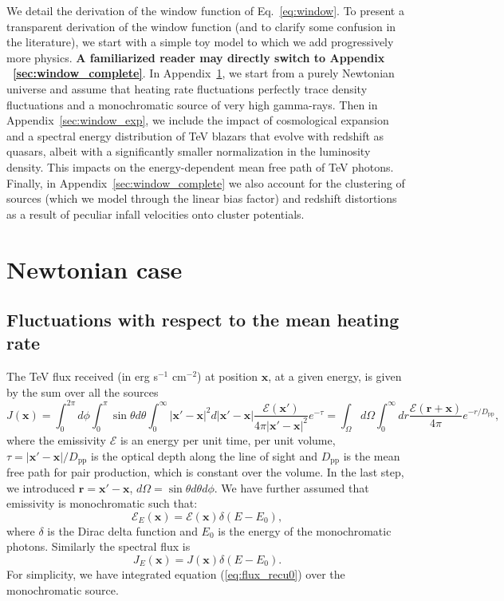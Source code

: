 \documentclass[numberedappendix]{emulateapj}
\newcommand\ALc[1]{{\color{red} \bf #1}} %
\begin{document}
\appendix
We detail the derivation of the window function of Eq.~\eqref{eq:window}. To present a transparent derivation of the window function (and to clarify some confusion in the literature), we start with a simple toy model to which we add progressively more physics. \ALc{A familiarized reader may directly switch to Appendix ~\ref{sec:window_complete}}. In Appendix~\ref{sec:windon_newt}, we start from a purely Newtonian universe and assume that heating rate fluctuations perfectly trace density fluctuations and a monochromatic source of very high gamma-rays. Then in Appendix~\ref{sec:window_exp}, we include the impact of cosmological expansion and a spectral energy distribution of TeV blazars that evolve with redshift as quasars, albeit with a significantly smaller normalization in the luminosity density. This impacts on the energy-dependent mean free path of TeV photons. Finally, in Appendix~\ref{sec:window_complete} we also account for the clustering of sources (which we model through the linear bias factor) and redshift distortions as a result of peculiar infall velocities onto cluster potentials. \\

\section {Newtonian case}\label{sec:windon_newt}
\subsection {Fluctuations with respect to the mean heating rate}

The TeV flux received (in erg s$^{-1}$ cm$^{-2}$) at position $\mathbf{x}$, at a given energy, is given by the sum over all the sources 
\begin{equation}
  \label{eq:flux_recu0}
  J(\mathbf{x})=
  \int_{0}^{2\pi}d\phi\int_{0}^{\pi}\sin\theta d\theta\int_0^{\infty}|\mathbf{x}'-\mathbf{x}|^2 d|\mathbf{x}'-\mathbf{x}|
  \frac{\mathcal{E}(\mathbf{x}') }{4\pi |\mathbf{x}'-\mathbf{x}|^2} e^{-\tau}
  =\int_{\Omega} d\Omega\int_0^{\infty} dr \frac{\mathcal{E}(\mathbf{r}+\mathbf{x}) }{4\pi } e^{- r/D_{\mathrm{pp}}},
\end{equation}
where the emissivity $\mathcal{E}$ is an energy per unit time, per unit volume, $\tau=|\mathbf{x}'-\mathbf{x}|/D_{\mathrm{pp}}$ is the optical depth along the line of sight and $D_{\mathrm{pp}}$ is the mean free path for pair production, which is constant over the volume. In the last step, we introduced $\mathbf{r}=\mathbf{x}'-\mathbf{x}$, $d\Omega=\sin\theta d\theta d\phi$. We have further assumed that emissivity is monochromatic such that:
\begin{equation}
\mathcal{E}_E(\mathbf{x}) = \mathcal{E}(\mathbf{x}) \delta(E-E_0),
\end{equation}
where $\delta$ is the Dirac delta function and $E_0$ is the energy of the monochromatic photons. Similarly the spectral flux is 
\begin{equation}
J_E(\mathbf{x}) = J(\mathbf{x}) \delta(E-E_0).
\end{equation}
For simplicity, we have integrated equation (\ref{eq:flux_recu0}) over the monochromatic source.
\end{document}
